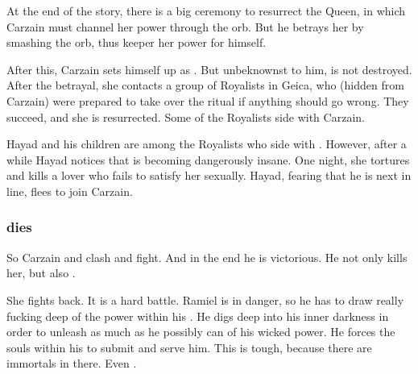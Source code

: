 At the end of the story, there is a big ceremony to resurrect the Queen, in which Carzain must channel her power through the orb. 
But he betrays her by smashing the orb, thus keeper her power for himself. 

After this, Carzain sets himself up as \caliph. 
But unbeknownst to him, \Belzir{} is not destroyed. 
After the betrayal, she contacts a group of Royalists in Geica, who (hidden from Carzain) were prepared to take over the ritual if anything should go wrong. 
They succeed, and she is resurrected. Some of the Royalists side with Carzain. 

Hayad and his children are among the Royalists who side with \Belzir. However, after a while Hayad notices that \Belzir{} is becoming dangerously insane. 
One night, she tortures and kills a lover who fails to satisfy her sexually. 
Hayad, fearing that he is next in line, flees to join Carzain. 





\subsubsection{\Shiaraid{} dies}
So Carzain and \Belzir{} clash and fight.
And in the end he is victorious. 
He not only kills her, but also . 

She fights back. 
It is a hard battle. 
Ramiel is in danger, so he has to draw really fucking deep of the power within his \carcer. 
He digs deep into his inner darkness in order to unleash as much as he possibly can of his wicked \sathariah{} power. 
He forces the souls within his \carcer{} to submit and serve him. 
This is tough, because there are immortals in there. 
Even \dragons. 

